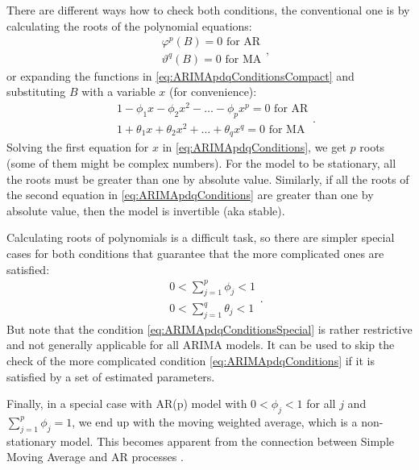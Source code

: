 \documentclass[]{book}
\theoremstyle{definition}
\theoremstyle{definition}
\theoremstyle{definition}
\theoremstyle{definition}
\theoremstyle{remark}
\begin{document}
There are different ways how to check both conditions, the conventional one is by calculating the roots of the polynomial equations:
\begin{equation}
\begin{aligned}
  & \varphi^p(B) = 0 \text{ for AR} \\
  & \vartheta^q(B) = 0 \text{ for MA}
\end{aligned} ,
  \label{eq:ARIMApdqConditionsCompact}
\end{equation}
or expanding the functions in \eqref{eq:ARIMApdqConditionsCompact} and substituting \(B\) with a variable \(x\) (for convenience):
\begin{equation}
\begin{aligned}
  & 1 -\phi_1 x -\phi_2 x^2 -\dots -\phi_p x^p = 0 \text{ for AR} \\
  & 1 + \theta_1 x + \theta_2 x^2 + \dots + \theta_q x^q = 0 \text{ for MA}
\end{aligned} .
  \label{eq:ARIMApdqConditions}
\end{equation}
Solving the first equation for \(x\) in \eqref{eq:ARIMApdqConditions}, we get \(p\) roots (some of them might be complex numbers). For the model to be stationary, all the roots must be greater than one by absolute value. Similarly, if all the roots of the second equation in \eqref{eq:ARIMApdqConditions} are greater than one by absolute value, then the model is invertible (aka stable).

Calculating roots of polynomials is a difficult task, so there are simpler special cases for both conditions that guarantee that the more complicated ones are satisfied:
\begin{equation}
\begin{aligned}
  & 0 < \sum_{j=1}^p \phi_j < 1 \\
  & 0 < \sum_{j=1}^q \theta_j < 1
\end{aligned} .
  \label{eq:ARIMApdqConditionsSpecial}
\end{equation}
But note that the condition \eqref{eq:ARIMApdqConditionsSpecial} is rather restrictive and not generally applicable for all ARIMA models. It can be used to skip the check of the more complicated condition \eqref{eq:ARIMApdqConditions} if it is satisfied by a set of estimated parameters.

Finally, in a special case with AR(p) model with \(0 < \phi_j < 1\) for all \(j\) and \(\sum_{j=1}^p \phi_j = 1\), we end up with the moving weighted average, which is a non-stationary model. This becomes apparent from the connection between Simple Moving Average and AR processes \citep{Svetunkov2017}.
\end{document}
